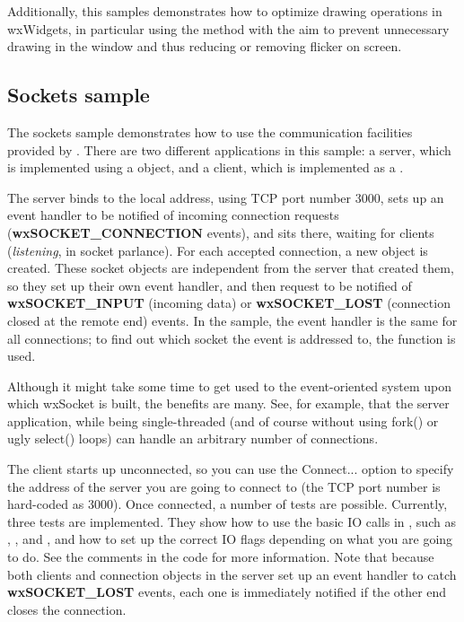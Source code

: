 Additionally, this samples demonstrates how to optimize drawing operations in wxWidgets,
in particular using the  method with
the aim to prevent unnecessary drawing in the window and thus reducing or removing
flicker on screen.


\subsection{Sockets sample}\label{samplesockets}

The sockets sample demonstrates how to use the communication facilities
provided by . There are two different
applications in this sample: a server, which is implemented using a
 object, and a client, which
is implemented as a .

The server binds to the local address, using TCP port number 3000,
sets up an event handler to be notified of incoming connection requests
({\bf wxSOCKET\_CONNECTION} events), and sits there, waiting for clients
({\it listening}, in socket parlance). For each accepted connection,
a new  object is created. These
socket objects are independent from the server that created them, so
they set up their own event handler, and then request to be notified
of {\bf wxSOCKET\_INPUT} (incoming data) or {\bf wxSOCKET\_LOST}
(connection closed at the remote end) events. In the sample, the event
handler is the same for all connections; to find out which socket the
event is addressed to, the  function
is used.

Although it might take some time to get used to the event-oriented
system upon which wxSocket is built, the benefits are many. See, for
example, that the server application, while being single-threaded
(and of course without using fork() or ugly select() loops) can handle
an arbitrary number of connections.

The client starts up unconnected, so you can use the Connect... option
to specify the address of the server you are going to connect to (the
TCP port number is hard-coded as 3000). Once connected, a number of
tests are possible. Currently, three tests are implemented. They show
how to use the basic IO calls in ,
such as , ,
 and ,
and how to set up the correct IO flags depending on what you are going to
do. See the comments in the code for more information. Note that because
both clients and connection objects in the server set up an event handler
to catch {\bf wxSOCKET\_LOST} events, each one is immediately notified
if the other end closes the connection.

